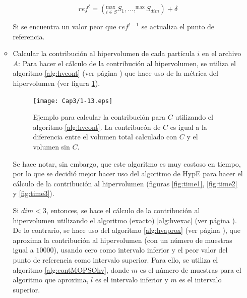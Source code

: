 \begin{enumerate}
\begin{itemize}
      \[ref^t = \left(^{\max}_{i\in S}S_1, \ldots, ^{\max}S_{dim} \right) + \delta\]

      Si se encuentra un valor peor que $ref^{t-1}$ se actualiza el punto de referencia. 
      
      \item Calcular la contribuci\'on al hipervolumen de cada part\'icula $i$ en el archivo $A$:       
      Para hacer el c\'alculo de la contribuci\'on al hipervolumen, se utiliza el algoritmo \ref{alg:hvcont} 
      (ver p\'agina \pageref{alg:hvcont}) que hace uso de la m\'etrica del hipervolumen (ver figura \ref{fig:contribucion}).
      
      \begin{figure}
      \begin{center}
	  \texttt{[image: Cap3/1-13.eps]}
      \end{center}
	\caption[Ejemplo de calculo de la contribuci\'on al hipervolumen]{Ejemplo para calcular la contribuci\'on para $C$ utilizando 
	el algoritmo \ref{alg:hvcont}. La contribuc\'on de $C$ es igual a la diferencia entre el volumen total calculado con $C$ y el 
	volumen sin $C$.}
      \label{fig:contribucion}
      \end{figure}
       
      Se hace notar, sin embargo, que este algoritmo es muy costoso en tiempo, por lo que se 
      decidi\'o mejor hacer uso del algoritmo de HypE para hacer el c\'alculo de la contribuci\'on al hipervolumen
      (figuras \ref{fig:time1}, \ref{fig:time2} y \ref{fig:time3}).
            
      Si $dim < 3$, entonces, se hace el c\'alculo de la contribuci\'on al hipervolumen utilizando el algoritmo 
      (exacto) \ref{alg:hvexac} (ver p\'agina \pageref{alg:hvexac}). De lo contrario, se hace uso del algoritmo \ref{alg:hvaprox} 
      (ver p\'agina \pageref{alg:hvaprox}), que aproxima la contribuci\'on al hipervolumen (con un n\'umero de muestras 
      igual a $10000$), usando cero como intervalo inferior y el peor valor del punto de referencia como intervalo superior.  
      Para ello, se utiliza el algoritmo \ref{alg:contMOPSOhv}, donde $m$ es el n\'umero de muestras para el algoritmo que
      aproxima, $l$ es el intervalo inferior y $m$ es el intervalo superior.
      
      

\end{itemize}
\end{enumerate}
